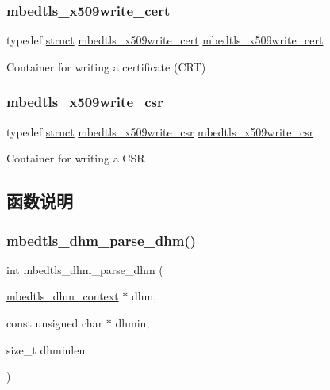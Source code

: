 \subsubsection{\texorpdfstring{mbedtls\+\_\+x509write\+\_\+cert}{mbedtls\_x509write\_cert}}
{\footnotesize\ttfamily typedef \hyperlink{interfacestruct}{struct} \hyperlink{structmbedtls__x509write__cert}{mbedtls\+\_\+x509write\+\_\+cert}
 \hyperlink{structmbedtls__x509write__cert}{mbedtls\+\_\+x509write\+\_\+cert}}

Container for writing a certificate (C\+RT) \mbox{\label{group__x509__module_ga7b0b4f8c5cfd541ee20c53907edb636d}} 
\subsubsection{\texorpdfstring{mbedtls\+\_\+x509write\+\_\+csr}{mbedtls\_x509write\_csr}}
{\footnotesize\ttfamily typedef \hyperlink{interfacestruct}{struct} \hyperlink{structmbedtls__x509write__csr}{mbedtls\+\_\+x509write\+\_\+csr}
 \hyperlink{structmbedtls__x509write__csr}{mbedtls\+\_\+x509write\+\_\+csr}}

Container for writing a C\+SR 

\subsection{函数说明}
\mbox{\label{group__x509__module_gae1bf556398cac1761aa2041908e9f619}} 
\subsubsection{\texorpdfstring{mbedtls\+\_\+dhm\+\_\+parse\+\_\+dhm()}{mbedtls\_dhm\_parse\_dhm()}}
{\footnotesize\ttfamily int mbedtls\+\_\+dhm\+\_\+parse\+\_\+dhm (\begin{DoxyParamCaption}\item[{\hyperlink{structmbedtls__dhm__context}{mbedtls\+\_\+dhm\+\_\+context} $\ast$}]{dhm,  }\item[{const unsigned char $\ast$}]{dhmin,  }\item[{size\+\_\+t}]{dhminlen }\end{DoxyParamCaption})}




